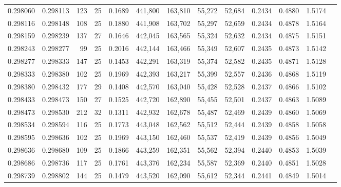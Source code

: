 \begin{tabular}{rrrrrrrrrrrrr}
0.298060 & 0.298113 &   123 &  25 &                                     0.1689 & 441,800 & 163,810 &  55,272 &  52,684 & 0.2434 & 0.4880 & 1.5174 \\
0.298116 & 0.298148 &   108 &  25 &                                     0.1880 & 441,908 & 163,702 &  55,297 &  52,659 & 0.2434 & 0.4878 & 1.5164 \\
0.298159 & 0.298239 &   137 &  27 &                                     0.1646 & 442,045 & 163,565 &  55,324 &  52,632 & 0.2434 & 0.4875 & 1.5151 \\
0.298243 & 0.298277 &    99 &  25 &                                     0.2016 & 442,144 & 163,466 &  55,349 &  52,607 & 0.2435 & 0.4873 & 1.5142 \\
0.298277 & 0.298333 &   147 &  25 &                                     0.1453 & 442,291 & 163,319 &  55,374 &  52,582 & 0.2435 & 0.4871 & 1.5128 \\
0.298333 & 0.298380 &   102 &  25 &                                     0.1969 & 442,393 & 163,217 &  55,399 &  52,557 & 0.2436 & 0.4868 & 1.5119 \\
0.298380 & 0.298432 &   177 &  29 &                                     0.1408 & 442,570 & 163,040 &  55,428 &  52,528 & 0.2437 & 0.4866 & 1.5102 \\
0.298433 & 0.298473 &   150 &  27 &                                     0.1525 & 442,720 & 162,890 &  55,455 &  52,501 & 0.2437 & 0.4863 & 1.5089 \\
0.298473 & 0.298530 &   212 &  32 &                                     0.1311 & 442,932 & 162,678 &  55,487 &  52,469 & 0.2439 & 0.4860 & 1.5069 \\
0.298534 & 0.298594 &   116 &  25 &                                     0.1773 & 443,048 & 162,562 &  55,512 &  52,444 & 0.2439 & 0.4858 & 1.5058 \\
0.298595 & 0.298636 &   102 &  25 &                                     0.1969 & 443,150 & 162,460 &  55,537 &  52,419 & 0.2439 & 0.4856 & 1.5049 \\
0.298636 & 0.298680 &   109 &  25 &                                     0.1866 & 443,259 & 162,351 &  55,562 &  52,394 & 0.2440 & 0.4853 & 1.5039 \\
0.298686 & 0.298736 &   117 &  25 &                                     0.1761 & 443,376 & 162,234 &  55,587 &  52,369 & 0.2440 & 0.4851 & 1.5028 \\
0.298739 & 0.298802 &   144 &  25 &                                     0.1479 & 443,520 & 162,090 &  55,612 &  52,344 & 0.2441 & 0.4849 & 1.5014 \\

\end{tabular}
